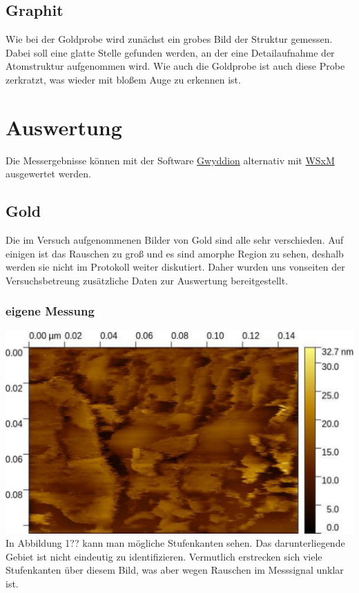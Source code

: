\documentclass[12pt,a4paper]{scrartcl}
\numberwithin{equation}{section} %
\begin{document}
\hypertarget{graphit}{%
\subsection{Graphit}\label{graphit}}

Wie bei der Goldprobe wird zunächst ein grobes Bild der Struktur
gemessen. Dabei soll eine glatte Stelle gefunden werden, an der eine
Detailaufnahme der Atomstruktur aufgenommen wird. Wie auch die Goldprobe
ist auch diese Probe zerkratzt, was wieder mit bloßem Auge zu erkennen
ist.

\hypertarget{auswertung}{%
\section{Auswertung}\label{auswertung}}

Die Messergebnisse können mit der Software
\href{http://gwyddion.net}{Gwyddion} \cite{Gwyddion} alternativ mit
\href{http://www.wsxm.eu}{WSxM} \cite{WSxM} ausgewertet werden.

\hypertarget{gold-1}{%
\subsection{Gold}\label{gold-1}}

Die im Versuch aufgenommenen Bilder von Gold sind alle sehr verschieden.
Auf einigen ist das Rauschen zu groß und es sind amorphe Region zu
sehen, deshalb werden sie nicht im Protokoll weiter diskutiert. Daher
wurden uns vonseiten der Versuchsbetreung zusätzliche Daten zur
Auswertung bereitgestellt. \cite{Grover}

\hypertarget{eigene-messung}{%
\subsubsection{eigene Messung}\label{eigene-messung}}

\includegraphics{../media/B2.5/Gold_gross.pdf} In Abbildung 1?? kann man mögliche
Stufenkanten sehen. Das darunterliegende Gebiet ist nicht eindeutig zu
identifizieren. Vermutlich erstrecken sich viele Stufenkanten über
diesem Bild, was aber wegen Rauschen im Messsignal unklar ist.
\end{document}
